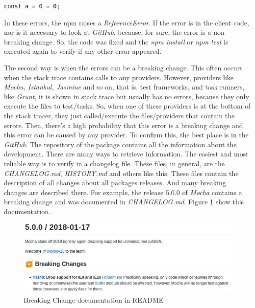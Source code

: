 \begin{lstlisting}[style=Javascript, label=cod:syntax:error, caption={Reference Error code in JavaScript}]
const a = 0 = 0;
\end{lstlisting}


In these errors, the npm raises a \textit{ReferenceError}. If the error is in the client code, nor is it necessary to look at \textit{GitHub}, because, for sure, the error is a non-breaking change. So, the code was fixed and the \textit{npm install} or \textit{npm test} is executed again to verify if any other error appeared.

The second way is when the errors can be a breaking change. This often occurs when the stack trace contains calls to any providers. However, providers like \textit{Mocha, Istanbul, Jasmine} and so on, that is, test frameworks, and task runners, like \textit{Grunt}, it is shown in stack trace but usually has no errors, because they only execute the files to test/tasks. So, when one of these providers is at the bottom of the stack tracer, they just called/execute the files/providers that contain the errors. Then, there’s a high probability that this error is a breaking change and this error can be caused by any provider.
To confirm this, the best place is in the \textit{GitHub}. The repository of the package contains all the information about the development. There are many ways to retrieve information. The easiest and most reliable way is to verify in a changelog file. These files, in general, are the \textit{CHANGELOG.md}, \textit{HISTORY.md} and others like this. These files contain the description of all changes about all packages releases. And many breaking changes are described there. For example, the release 5.0.0 of \textit{Mocha} contains a breaking change and was documented in \textit{CHANGELOG.md}. Figure \ref{fig:bc_documentation} show this documentation.

\begin{figure}
    \centering
    \includegraphics[scale=0.55]{figuras/bc_documentation.jpeg}
    \caption{Breaking Change documentation in README}
    \label{fig:bc_documentation}
\end{figure}{}

